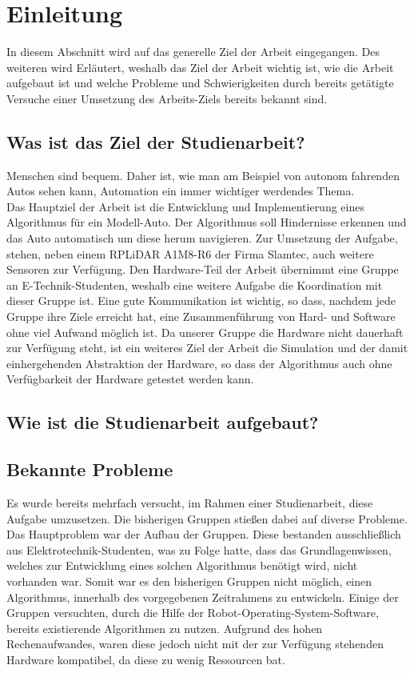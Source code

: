 \section{Einleitung}
In diesem Abschnitt wird auf das generelle Ziel der Arbeit eingegangen.
Des weiteren wird Erläutert, weshalb das Ziel der Arbeit wichtig ist, wie die Arbeit aufgebaut ist und welche Probleme und Schwierigkeiten durch bereits getätigte Versuche einer Umsetzung des Arbeits-Ziels bereits bekannt sind.

\subsection{Was ist das Ziel der Studienarbeit?}
    Menschen sind bequem.
    Daher ist, wie man am Beispiel von autonom fahrenden Autos sehen kann, Automation ein immer wichtiger werdendes Thema.\\

    Das Hauptziel der Arbeit ist die Entwicklung und Implementierung eines Algorithmus für ein Modell-Auto. 
    Der Algorithmus soll Hindernisse erkennen und das Auto automatisch um diese herum navigieren.
    Zur Umsetzung der Aufgabe, stehen, neben einem RPLiDAR A1M8-R6 der Firma Slamtec, auch weitere Sensoren zur Verfügung.
    Den Hardware-Teil der Arbeit übernimmt eine Gruppe an E-Technik-Studenten, weshalb eine weitere Aufgabe die Koordination mit dieser Gruppe ist.
    Eine gute Kommunikation ist wichtig, so dass, nachdem jede Gruppe ihre Ziele erreicht hat, eine Zusammenführung von Hard- und Software ohne viel Aufwand möglich ist.
    Da unserer Gruppe die Hardware nicht dauerhaft zur Verfügung steht, ist ein weiteres Ziel der Arbeit die Simulation und der damit einhergehenden Abstraktion der Hardware, so dass der Algorithmus auch ohne Verfügbarkeit der Hardware getestet werden kann.    

\subsection{Wie ist die Studienarbeit aufgebaut?}


\subsection{Bekannte Probleme}
    Es wurde bereits mehrfach versucht, im Rahmen einer Studienarbeit, diese Aufgabe umzusetzen.
    Die bisherigen Gruppen stießen dabei auf diverse Probleme.
    Das Hauptproblem war der Aufbau der Gruppen.
    Diese bestanden ausschließlich aus Elektrotechnik-Studenten, was zu Folge hatte, dass das Grundlagenwissen, welches zur Entwicklung eines solchen Algorithmus benötigt wird, nicht vorhanden war.
    Somit war es den bisherigen Gruppen nicht möglich, einen Algorithmus, innerhalb des vorgegebenen Zeitrahmens zu entwickeln.
    Einige der Gruppen versuchten, durch die Hilfe der Robot-Operating-System-Software, bereits existierende Algorithmen zu nutzen. 
    Aufgrund des hohen Rechenaufwandes, waren diese jedoch nicht mit der zur Verfügung stehenden Hardware kompatibel, da diese zu wenig Ressourcen bat.\\

